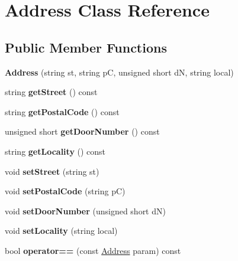\hypertarget{classAddress}{}\section{Address Class Reference}
\label{classAddress}
\subsection*{Public Member Functions}
\begin{DoxyCompactItemize}
\item 
\mbox{\label{classAddress_ace297fb6ac850754b99531ec11f299cc}} 
{\bfseries Address} (string st, string pC, unsigned short dN, string local)
\item 
\mbox{\label{classAddress_a25660f634b739d8a6098cbfa5a4610d2}} 
string {\bfseries get\+Street} () const
\item 
\mbox{\label{classAddress_aa87e14a134de15de628ddf53df2b4b70}} 
string {\bfseries get\+Postal\+Code} () const
\item 
\mbox{\label{classAddress_ad6c48032524632f60ccf1057f2fdf208}} 
unsigned short {\bfseries get\+Door\+Number} () const
\item 
\mbox{\label{classAddress_a8c49d8b42c275dc17d5de5d4ebdce5eb}} 
string {\bfseries get\+Locality} () const
\item 
\mbox{\label{classAddress_a723fb86b5a1da8ab650f69fbe0d83ebb}} 
void {\bfseries set\+Street} (string st)
\item 
\mbox{\label{classAddress_a0138e2d5b6528bedf0a6edf775336fad}} 
void {\bfseries set\+Postal\+Code} (string pC)
\item 
\mbox{\label{classAddress_adf4b73ed387b972fcddc26a458cccfeb}} 
void {\bfseries set\+Door\+Number} (unsigned short dN)
\item 
\mbox{\label{classAddress_a7e0e4f0ebd70e5f7252622b246b582bf}} 
void {\bfseries set\+Locality} (string local)
\item 
\mbox{\label{classAddress_a98c03308c9c288e0a2843e566dc2abb9}} 
bool {\bfseries operator==} (const \hyperlink{classAddress}{Address} param) const
\end{DoxyCompactItemize}
